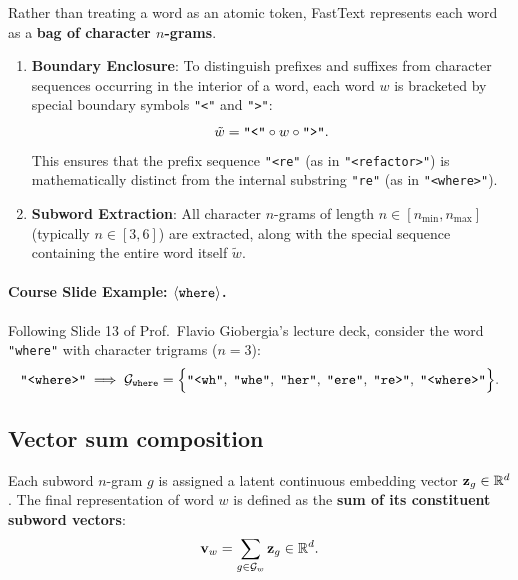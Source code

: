 \documentclass[../../main.tex]{subfiles}
\begin{document}
Rather than treating a word as an atomic token, FastText represents each word as a \textbf{bag of character $n$-grams}.

\begin{enumerate}
    \item \textbf{Boundary Enclosure}: To distinguish prefixes and suffixes from character sequences occurring in the interior of a word, each word $w$ is bracketed by special boundary symbols \texttt{"<"} and \texttt{">"}:
    \begin{equation}
    \label{eq:boundary_enclosure}
    \tilde{w} = \text{\texttt{"<"}} \circ w \circ \text{\texttt{">"}}.
    \end{equation}
    This ensures that the prefix sequence \texttt{"<re"} (as in \texttt{"<refactor>"}) is mathematically distinct from the internal substring \texttt{"re"} (as in \texttt{"<where>"}).
    
    \item \textbf{Subword Extraction}: All character $n$-grams of length $n \in [n_{\min}, n_{\max}]$ (typically $n \in [3, 6]$) are extracted, along with the special sequence containing the entire word itself $\tilde{w}$.
\end{enumerate}

\paragraph{Course Slide Example: $\langle\text{\texttt{where}}\rangle$.}
Following Slide 13 of Prof.~Flavio Giobergia's lecture deck, consider the word \texttt{"where"} with character trigrams ($n = 3$):
\begin{equation}
\label{eq:fasttext_subwords}
\text{\texttt{"<where>"}} \implies \mathcal{G}_{\text{\texttt{where}}} = \Big\{ \text{\texttt{"<wh"}}, \; \text{\texttt{"whe"}}, \; \text{\texttt{"her"}}, \; \text{\texttt{"ere"}}, \; \text{\texttt{"re>"}}, \; \text{\texttt{"<where>"}} \Big\}.
\end{equation}

\subsection{Vector sum composition}
\label{subsec:fasttext_composition}

Each subword $n$-gram $g$ is assigned a latent continuous embedding vector $\mathbf{z}_g \in \mathbb{R}^d$. The final representation of word $w$ is defined as the \textbf{sum of its constituent subword vectors}:
\begin{equation}
\label{eq:fasttext_sum}
\mathbf{v}_w = \sum_{g \in \mathcal{G}_w} \mathbf{z}_g \in \mathbb{R}^d.
\end{equation}
\end{document}
